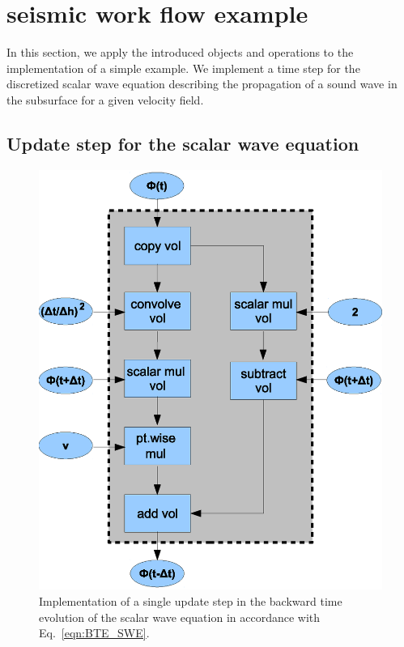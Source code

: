 \documentclass[12pt,a4paper]{article}
\newcommand{\eqnref}[1]{Eq.~\ref{#1}}
\begin{document}
\section{seismic work flow example}

In this section, we apply the introduced objects and operations
to the implementation of a simple example. 
We implement a time step for the discretized scalar 
wave equation describing the propagation of a sound wave in the 
subsurface for a given velocity field. 

% 

\subsection{Update step for the scalar wave equation}

\begin{figure}[h]
\hspace{-1.3cm}
\begin{center}
\includegraphics[width = 0.6\linewidth]{./SWE_Update.eps}
\end{center}
\vspace{-1.3cm}
\caption{Implementation of a single update step in the backward time evolution of the scalar
wave equation in accordance with \eqnref{eqn:BTE_SWE}.\label{fig:SWE_Update}}
\end{figure}
\end{document}

